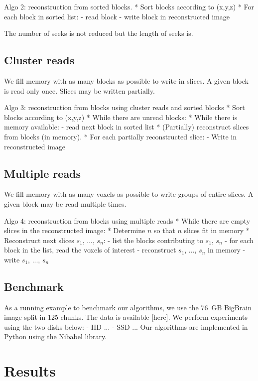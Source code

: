 \documentclass[10pt, conference, compsocconf]{IEEEtran}
\begin{document}
Algo 2: reconstruction from sorted blocks.
* Sort blocks according to (x,y,z)
* For each block in sorted list:
  - read block
  - write block in reconstructed image

The number of seeks is not reduced but the length of seeks is.

\subsection{Cluster reads}

We fill memory with as many blocks as possible to write in slices. A
given block is read only once. Slices may be written partially.

Algo 3: reconstruction from blocks using cluster reads and sorted blocks
* Sort blocks according to (x,y,z)
* While there are unread blocks:
  * While there is memory available:
    - read next block in sorted list
  * (Partially) reconstruct slices from blocks (in memory).
  * For each partially reconstructed slice:
    - Write in reconstructed image

\subsection{Multiple reads}

We fill memory with as many voxels as possible to write groups of
entire slices. A given block may be read multiple times.

Algo 4: reconstruction from blocks using multiple reads
* While there are empty slices in the reconstructed image:
  * Determine $n$ so that $n$ slices fit in memory
  * Reconstruct next slices $s_1$, ...,  $s_n$:
     - list the blocks contributing to $s_1$, $s_n$
     - for each block in the list, read the voxels of interest
     - reconstruct $s_1$, ..., $s_n$ in memory
     - write $s_1$, ..., $s_n$

\subsection{Benchmark}

As a running example to benchmark our algorithms, we use the 76~GB
BigBrain image split in 125 chunks. The data is available [here]. We
perform experiments using the two disks below:
- HD ...
- SSD ...
Our algorithms are implemented in Python using the Nibabel library. 

\section{Results}
\end{document}
